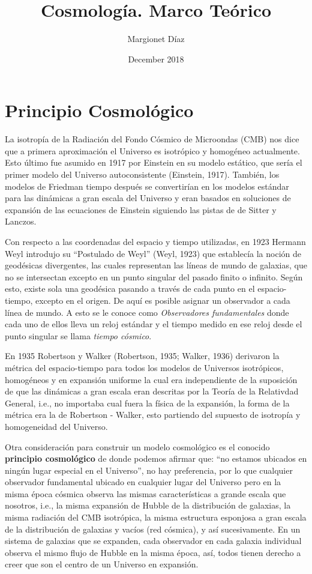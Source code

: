 \documentclass{article}
\title{Cosmología. Marco Teórico}
\author{Margionet Díaz}
\date{December 2018}
\begin{document}
\sloppy %

\maketitle

\section{Principio Cosmológico}

La isotropía de la Radiación del Fondo Cósmico de Microondas (CMB) nos dice que a primera aproximación el Universo es isotrópico y homogéneo actualmente. Esto último fue asumido en 1917 por Einstein en su modelo estático, que sería el primer modelo del Universo autoconsistente (Einstein, 1917). También, los modelos de Friedman tiempo después se convertirían en los modelos estándar para las dinámicas a gran escala del Universo y eran basados en soluciones de expansión de las ecuaciones de Einstein siguiendo las pistas de de Sitter y Lanczos.



Con respecto a las coordenadas del espacio y tiempo utilizadas, en 1923 Hermann Weyl introdujo su ``Postulado de Weyl'' (Weyl, 1923) que establecía la noción de geodésicas divergentes, las cuales representan las líneas de mundo de galaxias, que no se intersectan excepto en un punto singular del pasado finito o infinito. Según esto, existe sola una geodésica pasando a través de cada punto en el espacio-tiempo, excepto en el origen.  De aquí es posible asignar un observador a cada línea de mundo. A esto se le conoce como {\textit{Observadores fundamentales}} donde cada uno de ellos lleva un reloj estándar y el tiempo medido en ese reloj desde el punto singular se llama {\textit{tiempo cósmico}}.

En 1935 Robertson y Walker (Robertson, 1935; Walker, 1936) derivaron la métrica del espacio-tiempo para todos los modelos de Universos isotrópicos, homogéneos y en expansión uniforme la cual era independiente de la suposición de que las dinámicas a gran escala eran descritas por la Teoría de la Relativdad General, i.e., no importaba cual fuera la física de la expansión,  la forma de la métrica era la de Robertson - Walker, esto partiendo del supuesto de isotropía y homogeneidad del Universo. 

Otra consideración para construir un modelo cosmológico es el conocido {\bf{principio cosmológico}} de donde podemos afirmar que: ``no estamos ubicados en ningún lugar especial en el Universo'', no hay preferencia, por lo que cualquier observador fundamental ubicado en cualquier lugar del Universo pero en la misma época cósmica observa las mismas características a grande escala que nosotros, i.e., la misma expansión de Hubble de la distribución de galaxias, la misma radiación del CMB isotrópica, la misma estructura esponjosa a gran escala de la distribución de galaxias y vacíos (red cósmica), y así sucesivamente. 
En un sistema de galaxias que se expanden, cada observador en cada galaxia individual observa el mismo flujo de Hubble en la misma época, así, todos tienen derecho a creer que son el centro de un Universo en expansión. 
\end{document}
